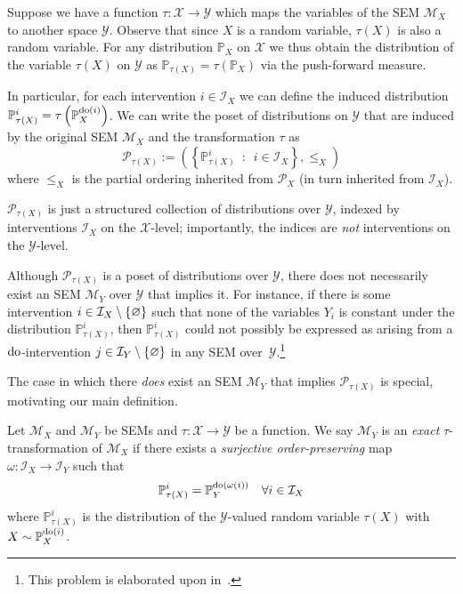 Suppose we have a function ${\tau: \mathcal{X} \to \mathcal{Y}}$ which maps the variables of the SEM $\mathcal{M}_X$ to another space $\mathcal{Y}$.
Observe that since $X$ is a random variable, $\tau(X)$ is also a random variable.
For any distribution $\mathbb{P}_X$ on $\mathcal{X}$ we thus obtain the distribution of the variable $\tau(X)$ on $\mathcal{Y}$ as $\mathbb{P}_{\tau(X)} = \tau\left(\mathbb{P}_X\right)$ via the push-forward measure. 

In particular, for each intervention $i \in \mathcal{I}_X$ we can define the induced distribution $\mathbb{P}_{\tau(X)}^{i} = \tau\left(\mathbb{P}_X^{\operatorname{do}(i)}\right)$.
We can write the poset of distributions on $\mathcal{Y}$ that are induced by the original SEM $\mathcal{M}_X$ and the transformation $\tau$ as
\[\mathcal{P}_{\tau(X)} := \left( \left\{ \mathbb{P}_{\tau(X)}^{i} \enspace : \enspace i \in \mathcal{I}_X \right\}, \leq_X \right) \]
where $\leq_X$ is the partial ordering inherited from $\mathcal{P}_X$ (in turn inherited from $\mathcal{I}_X$).

$\mathcal{P}_{\tau(X)}$ is just a structured collection of distributions over $\mathcal{Y}$, indexed by interventions $\mathcal{I}_X$ on the $\mathcal{X}$-level; importantly, the indices are \emph{not} interventions on the $\mathcal{Y}$-level.



Although $\mathcal{P}_{\tau(X)}$ is a poset of distributions over $\mathcal{Y}$, there does not necessarily exist an SEM $\mathcal{M}_Y$ over $\mathcal{Y}$ that implies it.
For instance, if there is some intervention ${i \in \mathcal{I}_X \setminus \{ \varnothing \}}$ such that none of the variables $Y_i$ is constant under the distribution $\mathbb{P}_{\tau(X)}^{i}$, then $\mathbb{P}_{\tau(X)}^{i}$ could not possibly be expressed as arising from a $\operatorname{do}$-intervention $j\in \mathcal{I}_Y \setminus \{\varnothing\}$ in any SEM over~$\mathcal{Y}$.\footnote{This problem is elaborated upon in~\cite{eberhardt2016green}.}

The case in which there \emph{does} exist an SEM $\mathcal{M}_Y$ that implies $\mathcal{P}_{\tau(X)}$ is special, motivating our main definition.

\begin{definition}\label{def:exacttrafos}
Let $\mathcal{M}_X$ and $\mathcal{M}_Y$ be SEMs and $\tau: \mathcal{X} \to \mathcal{Y}$ be a function.
We say $\mathcal{M}_Y$ is an \emph{exact}  $\tau$-transformation of $\mathcal{M}_X$ if there exists a \emph{surjective order-preserving} map $\omega:\mathcal{I}_X\rightarrow \mathcal{I}_Y$ such that
\[ \mathbb{P}_{\tau(X)}^{i} = \mathbb{P}_Y^{\operatorname{do}(\omega(i))} \quad \forall i \in \mathcal{I}_X \]
where $\mathbb{P}_{\tau(X)}^{i}$ is the distribution of the $\mathcal{Y}$-valued random variable $\tau(X)$ with $X \sim \mathbb{P}_X^{\operatorname{do}(i)}$.
\end{definition}

